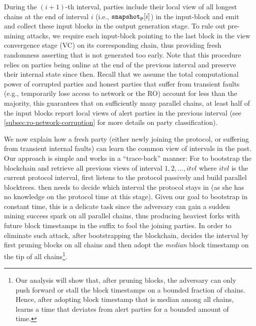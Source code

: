 During the $(i + 1)$-th interval, parties include their local view of all longest chains at the end of interval $i$ (i.e., $\mathtt{snapshot}_\mathsf{P}[i]$) in the input-block and emit and collect these input blocks in the output generation stage.
%
To rule out pre-mining attacks, we require each input-block  pointing to the last block in the view convergence stage (\textsf{VC}) on its corresponding chain, thus providing fresh randomness asserting that  is not generated too early.
%
Note that this procedure relies on parties being online at the end of the previous interval and preserve their internal state since then.
%
Recall that we assume the total computational power of corrupted parties and honest parties that suffer from transient faults (e.g., temporarily lose access to network or the RO) account for less than the majority, this guarantees that on sufficiently many parallel chains, at least half of the input blocks report local views of alert parties in the previous interval (see \cref{subsec:ro-network-corruption} for more details on party classification).

We now explain how a fresh party \newParty (either newly joining the protocol, or suffering from transient internal faults) can learn the common view of intervals in the past.
%
Our approach is simple and works in a ``trace-back'' manner:
%
For \newParty to bootstrap the blockchain and retrieve all previous views of interval $1, 2, \ldots, itvl$ where $itvl$ is the current protocol interval, \newParty first listens to the protocol passively and build parallel blocktrees.
%
\newParty then needs to decide which interval the protocol stays in (as she has no knowledge on the protocol time at this stage).
%
Given our goal to bootstrap in constant time, this is a delicate task since the adversary can gain a sudden mining success spark on all parallel chains, thus producing heaviest forks with future block timestamps in the suffix to fool the joining parties.
%
In order to eliminate such attack, after bootstrapping the blockchain, \newParty decides the interval by first pruning \kbootstr blocks on all chains and then adopt the \emph{median} block timestamp on the tip of all chains\footnote{Our analysis will show that, after pruning \kbootstr blocks, the adversary can only push forward or stall the block timestamps on a bounded fraction of chains. Hence, after adopting block timestamp that is median among all chains, \newParty learns a time that deviates from alert parties for a bounded amount of time.}.

